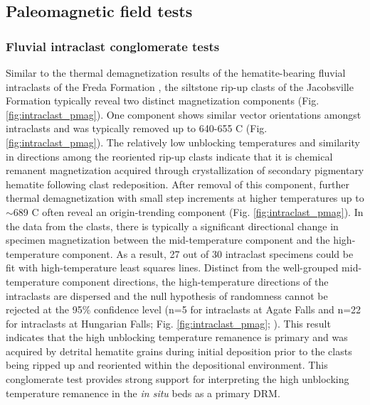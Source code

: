 \documentclass[draft]{agujournal2019}
\begin{document}
\subsection*{Paleomagnetic field tests}

\subsubsection*{Fluvial intraclast conglomerate tests}

Similar to the thermal demagnetization results of the hematite-bearing fluvial intraclasts of the Freda Formation \cite{Swanson-Hysell2019b}, the siltstone rip-up clasts of the Jacobsville Formation typically reveal two distinct magnetization components (Fig. \ref{fig:intraclast_pmag}). One component shows similar vector orientations amongst intraclasts and was typically removed up to 640-655 \textdegree C (Fig. \ref{fig:intraclast_pmag}). The relatively low unblocking temperatures and similarity in directions among the reoriented rip-up clasts indicate that it is chemical remanent magnetization acquired through crystallization of secondary pigmentary hematite following clast redeposition. After removal of this component, further thermal demagnetization with small step increments at higher temperatures up to $\sim$689 \textdegree C often reveal an origin-trending component (Fig. \ref{fig:intraclast_pmag}). In the data from the clasts, there is typically a significant directional change in specimen magnetization between the mid-temperature component and the high-temperature component. As a result, 27 out of 30 intraclast specimens could be fit with high-temperature least squares lines. Distinct from the well-grouped mid-temperature component directions, the high-temperature directions of the intraclasts are dispersed and the null hypothesis of randomness cannot be rejected at the 95\% confidence level (n=5 for intraclasts at Agate Falls and n=22 for intraclasts at Hungarian Falls; Fig. \ref{fig:intraclast_pmag}; ). This result indicates that the high unblocking temperature remanence is primary and was acquired by detrital hematite grains during initial deposition prior to the clasts being ripped up and reoriented within the depositional environment. This conglomerate test provides strong support for interpreting the high unblocking temperature remanence in the \textit{in situ} beds as a primary DRM. 
\end{document}
